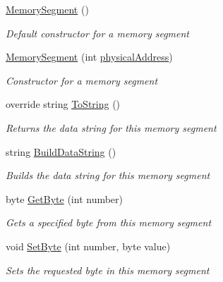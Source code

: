 \begin{DoxyCompactItemize}
\item 
\hyperlink{class_c_p_u___o_s___simulator_1_1_memory_1_1_memory_segment_abd9c898ff9488aaee755f538a3197477}{Memory\+Segment} ()
\begin{DoxyCompactList}\small\item\em Default constructor for a memory segment \end{DoxyCompactList}\item 
\hyperlink{class_c_p_u___o_s___simulator_1_1_memory_1_1_memory_segment_a92848c6604c9d6a9d958783ad7cae24f}{Memory\+Segment} (int \hyperlink{class_c_p_u___o_s___simulator_1_1_memory_1_1_memory_segment_af6d25683cc2a80607238dda52b09d457}{physical\+Address})
\begin{DoxyCompactList}\small\item\em Constructor for a memory segment \end{DoxyCompactList}\item 
override string \hyperlink{class_c_p_u___o_s___simulator_1_1_memory_1_1_memory_segment_a1c94b824fe1fdfc4a0b817a031f3d51d}{To\+String} ()
\begin{DoxyCompactList}\small\item\em Returns the data string for this memory segment \end{DoxyCompactList}\item 
string \hyperlink{class_c_p_u___o_s___simulator_1_1_memory_1_1_memory_segment_a7ad206d46b52b795ba48018afe0174ed}{Build\+Data\+String} ()
\begin{DoxyCompactList}\small\item\em Builds the data string for this memory segment \end{DoxyCompactList}\item 
byte \hyperlink{class_c_p_u___o_s___simulator_1_1_memory_1_1_memory_segment_af3e1120c597c91c8f7aa7faf29d3eda0}{Get\+Byte} (int number)
\begin{DoxyCompactList}\small\item\em Gets a specified byte from this memory segment \end{DoxyCompactList}\item 
void \hyperlink{class_c_p_u___o_s___simulator_1_1_memory_1_1_memory_segment_ab445c7247c0ca2a7b52606b4d14e268a}{Set\+Byte} (int number, byte value)
\begin{DoxyCompactList}\small\item\em Sets the requested byte in this memory segment \end{DoxyCompactList}\end{DoxyCompactItemize}
